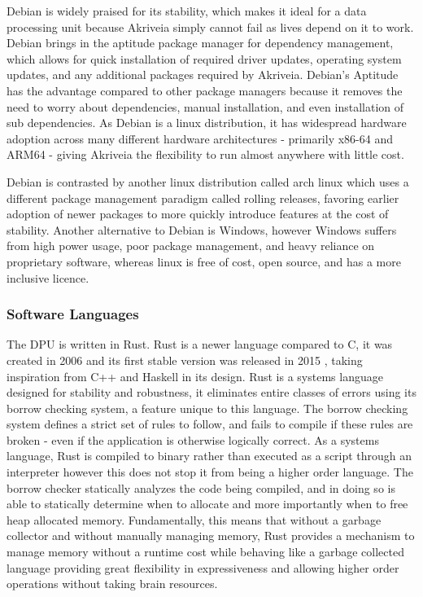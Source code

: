 \bigskip
Debian is widely praised for its stability, which makes it ideal for a data processing unit because Akriveia simply cannot fail as lives depend on it to work.
Debian brings in the aptitude package manager for dependency management, which allows for quick installation of required driver updates, operating system updates, and any additional packages required by Akriveia.
Debian's Aptitude has the advantage compared to other package managers because it removes the need to worry about dependencies, manual installation, and even installation of sub dependencies.
As Debian is a linux distribution, it has widespread hardware adoption across many different hardware architectures - primarily x86-64 and ARM64 - giving Akriveia the flexibility to run almost anywhere with little cost.

\bigskip
Debian is contrasted by another linux distribution called arch linux which uses a different package management paradigm called rolling releases, favoring earlier adoption of newer packages to more quickly introduce features at the cost of stability.
Another alternative to Debian is Windows, however Windows suffers from high power usage, poor package management, and heavy reliance on proprietary software, whereas linux is free of cost, open source, and has a more inclusive licence.

\pagebreak
\subsubsection{Software Languages}
The DPU is written in Rust.
Rust is a newer language compared to C, it was created in 2006 \cite{rust_graydon_interview} and its first stable version was released in 2015 \cite{rust_releases}, taking inspiration from C++ and Haskell in its design.
Rust is a systems language designed for stability and robustness, it eliminates entire classes of errors using its borrow checking system, a feature unique to this language.
The borrow checking system defines a strict set of rules to follow, and fails to compile if these rules are broken - even if the application is otherwise logically correct.
As a systems language, Rust is compiled to binary rather than executed as a script through an interpreter however this does not stop it from being a higher order language.
The borrow checker statically analyzes the code being compiled, and in doing so is able to statically determine when to allocate and more importantly when to free heap allocated memory.
Fundamentally, this means that without a garbage collector and without manually managing memory, Rust provides a mechanism to manage memory without a runtime cost while behaving like a garbage collected language providing great flexibility in expressiveness and allowing higher order operations without taking brain resources.

